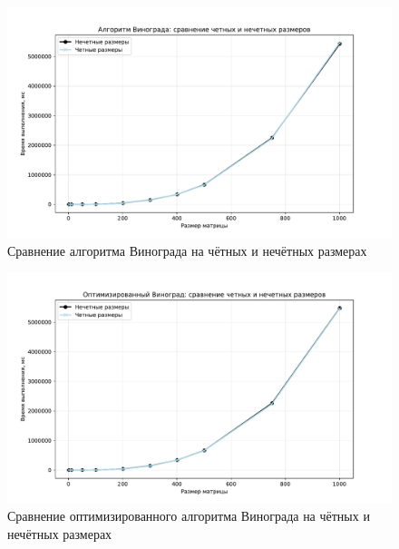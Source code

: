 \begin{figure}[H]
	\hspace*{-2cm}
	\includegraphics[scale=0.8]{images/winograd_odd_vs_even.pdf}
	\caption{Сравнение алгоритма Винограда на чётных и нечётных размерах}
	\label{img:graph_Win_odd_vs_even}
\end{figure}

\begin{figure}[H]
	\hspace*{-2cm}
	\includegraphics[scale=0.8]{images/optwinograd_odd_vs_even.pdf}
	\caption{Сравнение оптимизированного алгоритма Винограда на чётных и нечётных размерах}
	\label{img:graph_optWin_odd_vs_even}
\end{figure}
\clearpage


